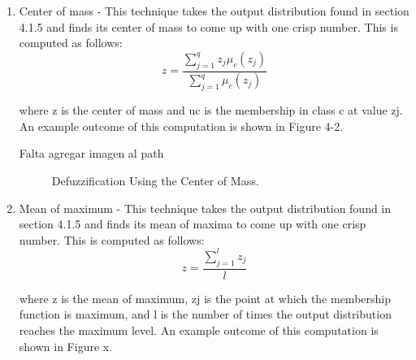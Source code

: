 \begin{enumerate} 
\item   Center of mass - This technique takes the output
distribution found in section 4.1.5 and finds its center of mass to come up with
one crisp number. This is computed as follows:
\begin{equation}\label{eq:centerM}
\displaystyle z=\frac{\sum_{j=1}^qz_j\mu_c(z_j)}{\sum_{j=1}^q\mu_c(z_j)}  
\end{equation}

where z is the center of mass and uc is the membership in class c at value zj.
An example outcome of this computation is shown in Figure 4-2.


Falta agregar imagen al path
\begin{figure}
\captionsetup{justification=centering,margin=2cm}
\centering
\setlength\fboxsep{0pt}
\setlength\fboxrule{0.7pt}
\caption{Defuzzification Using the Center of Mass.}
\label{fig:centerMass}       
\end{figure}



\item Mean of maximum - This technique takes the output distribution found in section
4.1.5 and finds its mean of maxima to come up with one crisp number. This is
computed as follows:
\begin{equation}\label{eq:centerM}
\displaystyle z=\frac{\sum_{j=1}^lz_j}{l}
\end{equation}

where z is the mean of maximum, zj is the point at which the membership function
is maximum, and l is the number of times the output distribution reaches the
maximum level. An example outcome of this computation is shown in Figure x.


\end{enumerate}
